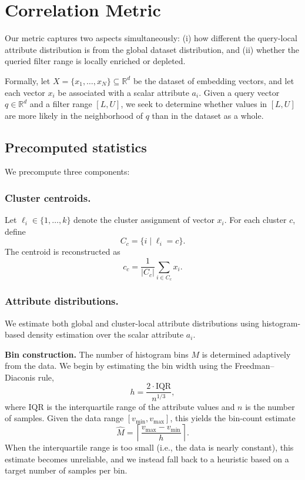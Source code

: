 \chapter{Correlation Metric}
Our metric captures two aspects simultaneously: (i) how different the query-local attribute distribution is from the global dataset distribution, and (ii) whether the queried filter range is locally enriched or depleted.

Formally, let \(X = \{x_1,\dots,x_N\} \subseteq \mathbb{R}^d\) be the dataset of embedding vectors, and let each vector \(x_i\) be associated with a scalar attribute \(a_i\). 
Given a query vector \(q \in \mathbb{R}^d\) and a filter range \([L,U]\), we seek to determine whether values in \([L,U]\) are more likely in the neighborhood of \(q\) than in the dataset as a whole.

\section{Precomputed statistics}
We precompute three components: 

\subsection{Cluster centroids.}
Let \(\ell_i \in \{1,\dots,k\}\) denote the cluster assignment of vector \(x_i\). 
For each cluster \(c\), define
\[
C_c = \{ i \mid \ell_i = c \}.
\]
The centroid is reconstructed as
\[
c_c = \frac{1}{|C_c|} \sum_{i \in C_c} x_i.
\]

\subsection{Attribute distributions.}
We estimate both global and cluster-local attribute distributions using histogram-based density estimation over the scalar attribute \(a_i\).

\textbf{Bin construction.}
The number of histogram bins $M$ is determined adaptively from the data.
We begin by estimating the bin width using the Freedman--Diaconis rule,
\[
h = \frac{2 \cdot \mathrm{IQR}}{n^{1/3}},
\]
where $\mathrm{IQR}$ is the interquartile range of the attribute values and $n$
is the number of samples. Given the data range $[v_{\min}, v_{\max}]$, this
yields the bin-count estimate
\[
\widehat{M} = \left\lceil \frac{v_{\max} - v_{\min}}{h} \right\rceil.
\]
When the interquartile range is too small (i.e., the data is nearly constant),
this estimate becomes unreliable, and we instead fall back to a heuristic based
on a target number of samples per bin.

